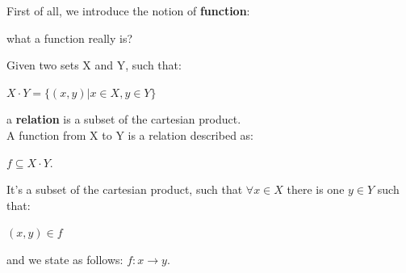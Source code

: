 First of all, we introduce the notion of \textbf{function}:
\begin{center}
    what a function really is?
\end{center}

\begin{definition}
    Given two sets X and Y, such that:
    \begin{center}
        $X \cdot Y=\{(x,y) | x \in X,y\in Y\}$
    \end{center}
    a \textbf{relation} is a subset of the cartesian product. \vspace{3pt} \\
    A function from X to Y is a relation described as:
    \begin{center}
        $f \subseteq X \cdot Y$.
    \end{center}
    It's a subset of the cartesian product, such that $\forall x \in X$ there is one $y \in Y$ such that:
    \begin{center}
        $(x,y) \in f$ 
    \end{center}
    and we state as follows:
    $f: x \rightarrow y$.
\end{definition}